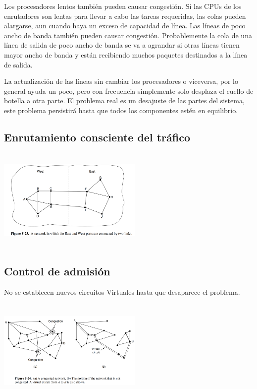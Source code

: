 \documentclass[10pt,a4paper]{report}
\begin{document}
	\par Los procesadores lentos también pueden causar congestión. Si las CPUs de los enrutadores son lentas para llevar a cabo las tareas requeridas, las colas pueden alargarse, aun cuando haya un exceso de capacidad de línea. Las líneas de poco ancho de banda también pueden causar congestión. Probablemente la cola de una línea de salida de poco ancho de banda se va a agrandar si otras líneas tienen mayor ancho de banda y están recibiendo muchos paquetes destinados a la línea de salida.

	\par La actualización de las líneas sin cambiar los procesadores o viceversa, por lo general ayuda un poco, pero con frecuencia simplemente solo desplaza el cuello de botella a otra parte. El problema real es un desajuste de las partes del sistema, este problema persistirá hasta que todos los componentes estén en equilibrio.

\subsection{Enrutamiento consciente del tráfico}

	\begin{center}
			\includegraphics[width=7cm, height=5cm]{./imagenes/consciente.png} 
	\end{center}

\subsection{Control de admisión}

	No se establecen nuevos circuitos Virtuales hasta que desaparece el problema.
	\begin{center}
			\includegraphics[width=7cm, height=5cm]{./imagenes/admision.png} 
	\end{center}
\end{document}
